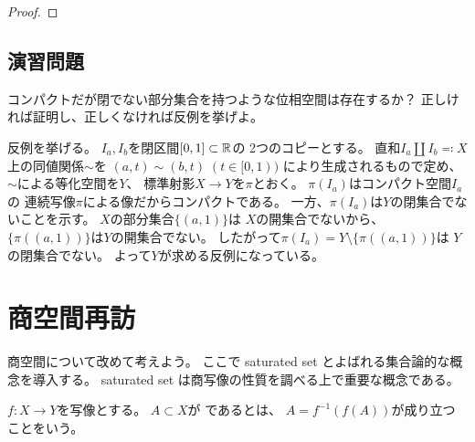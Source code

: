\documentclass[report]{jlreq}
\begin{document}
\begin{proposition}[パラコンパクト性の特徴付け]
    \TODO{}
\end{proposition}

\begin{proof}
    \TODO{}
\end{proof}

%
\section{演習問題}

\begin{problem}
    コンパクトだが閉でない部分集合を持つような位相空間は存在するか？
    正しければ証明し、正しくなければ反例を挙げよ。
\end{problem}

\begin{answer}
    反例を挙げる。
    $I_a, I_b$を閉区間$[0, 1] \subset \mathbb{R}$の
    2つのコピーとする。
    直和$I_a \amalg I_b \eqqcolon X$上の同値関係$\sim$を
    $(a, t) \sim (b, t) \; (t \in [0, 1))$
    により生成されるもので定め、
    $\sim$による等化空間を$Y$、
    標準射影$X \to Y$を$\pi$とおく。
    $\pi(I_a)$はコンパクト空間$I_a$の
    連続写像$\pi$による像だからコンパクトである。
    一方、$\pi(I_a)$は$Y$の閉集合でないことを示す。
    $X$の部分集合$\{ (a, 1) \}$は
    $X$の開集合でないから、
    $\{ \pi((a, 1)) \}$は$Y$の開集合でない。
    したがって$\pi(I_a) = Y \setminus \{ \pi((a, 1)) \}$は
    $Y$の閉集合でない。
    よって$Y$が求める反例になっている。
\end{answer}



%
\chapter{商空間再訪}

商空間について改めて考えよう。
ここで saturated set とよばれる集合論的な概念を導入する。
saturated set は商写像の性質を調べる上で重要な概念である。

\begin{definition}
    $f \colon X \to Y$を写像とする。
    $A \subset X$が
    であるとは、
    $A = f^{-1}(f(A))$が成り立つことをいう。
\end{definition}
\end{document}
